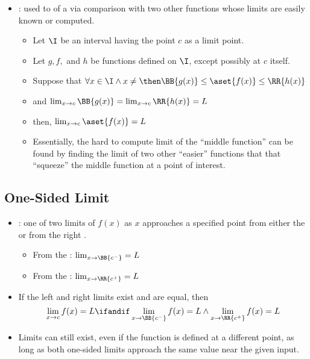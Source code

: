 \begin{itemize}
\begin{itemize}
    \item {}: used to  of a
       via comparison with two other
      functions whose limits are easily known or computed.
      \begin{itemize}
        \item Let \( \I  \) be an interval having the point \( c \) as a limit point.
        \item Let \( g, f, \) and \( h \) be functions defined on \( \I \),
          except possibly at \( c \) itself.
        \item Suppose that \( \forall x \in \I \land x \neq \then \BB{g(x)} \le
          \aset{f(x)} \le \RR{h(x)} \)
        \item and \( \lim_{x \to c} \BB{g(x)} = \lim_{x \to c} \RR{h(x)} = L \)
        \item then, \( \lim_{x \to c} \aset{f(x)} = L \)
        \item Essentially, the hard to compute limit of the ``middle function''
          can be found by finding the limit of two other ``easier'' functions
          that that ``squeeze'' the middle function at a point of interest.
      \end{itemize}

  \end{itemize}

  \subsection{One-Sided Limit}
  \begin{itemize}
    \item {}: one of two limits of \( f(x) \) as \( x \)
      approaches a specified point from either the  or from the right
      .
      \begin{multicols}{2}
        \begin{itemize}
          \item From the : \( \lim_{x \to \BB{c^-}} = L \)
          \item From the : \( \lim_{x \to \RR{c^+}} = L \)
        \end{itemize}
      \end{multicols}

    \item If the left and right limits exist and are equal, then
    \[
      \lim_{x \to c} f(x) = L \ifandif \lim_{x \to \BB{c^-}} f(x) = L \land
        \lim_{ x \to \RR{c^+}} f(x) = L
    \]
    \item Limits can still exist, even if the function is defined at a
      different point, as long as both one-sided limits approach the same value
      near the given input.

  \end{itemize}
\end{itemize}

